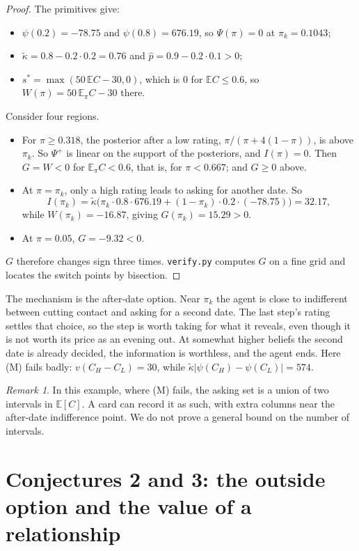 \documentclass[11pt,a4paper]{article}
\theoremstyle{definition}
\theoremstyle{remark}
\newtheorem{remark}[theorem]{Remark}
\newcommand{\E}{\mathbb{E}}
\newcommand{\pp}{\hat p}
\newcommand{\kt}{\tilde\kappa}
\begin{document}
\begin{proof}
The primitives give:
\begin{itemize}[nosep]
\item $\psi(0.2)=-78.75$ and $\psi(0.8)=676.19$, so $\Psi(\pi)=0$ at $\pi_k=0.1043$;
\item $\kt=0.8-0.2\cdot0.2=0.76$ and $\pp=0.9-0.2\cdot0.1>0$;
\item $s^*=\max(50\,\E C-30,0)$, which is $0$ for $\E C\le0.6$, so $W(\pi)=50\,\E_\pi C-30$ there.
\end{itemize}
Consider four regions.
\begin{itemize}
\item For $\pi\ge0.318$, the posterior after a low rating, $\pi/(\pi+4(1-\pi))$, is above $\pi_k$. So $\Psi^+$ is linear on the support of the posteriors, and $I(\pi)=0$. Then $G=W<0$ for $\E_\pi C<0.6$, that is, for $\pi<0.667$; and $G\ge0$ above.
\item At $\pi=\pi_k$, only a high rating leads to asking for another date. So
\[
I(\pi_k)=\kt\bigl(\pi_k\cdot0.8\cdot676.19+(1-\pi_k)\cdot0.2\cdot(-78.75)\bigr)=32.17,
\]
while $W(\pi_k)=-16.87$, giving $G(\pi_k)=15.29>0$.
\item At $\pi=0.05$, $G=-9.32<0$.
\end{itemize}
$G$ therefore changes sign three times. \texttt{verify.py} computes $G$ on a fine grid and locates the switch points by bisection.
\end{proof}

The mechanism is the after-date option. Near $\pi_k$ the agent is close to indifferent between cutting contact and asking for a second date. The last step's rating settles that choice, so the step is worth taking for what it reveals, even though it is not worth its price as an evening out. At somewhat higher beliefs the second date is already decided, the information is worthless, and the agent ends. Here (M) fails badly: $v(C_H-C_L)=30$, while $\kt|\psi(C_H)-\psi(C_L)|=574$.

\begin{remark}
In this example, where (M) fails, the asking set is a union of two intervals in $\E[C]$. A card can record it as such, with extra columns near the after-date indifference point. We do not prove a general bound on the number of intervals.
\end{remark}

\section{Conjectures 2 and 3: the outside option and the value of a relationship}\label{sec:c23}
\end{document}

